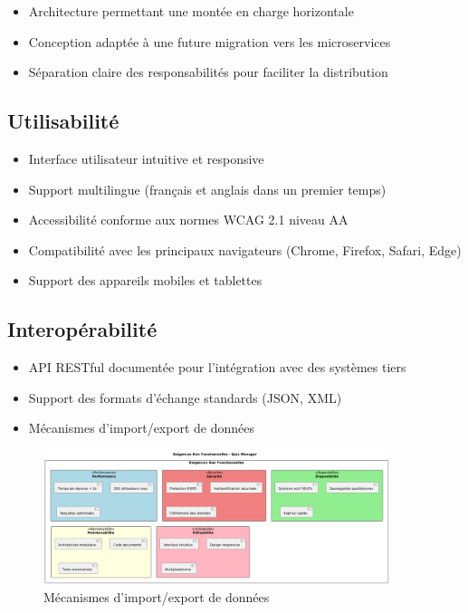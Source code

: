 \documentclass[12pt,a4paper]{report}
\begin{document}
\begin{itemize}
\item Architecture permettant une montée en charge horizontale
\item Conception adaptée à une future migration vers les microservices
\item Séparation claire des responsabilités pour faciliter la distribution
\end{itemize}

\subsection{Utilisabilité}

\begin{itemize}
\item Interface utilisateur intuitive et responsive
\item Support multilingue (français et anglais dans un premier temps)
\item Accessibilité conforme aux normes WCAG 2.1 niveau AA
\item Compatibilité avec les principaux navigateurs (Chrome, Firefox, Safari, Edge)
\item Support des appareils mobiles et tablettes
\end{itemize}

\subsection{Interopérabilité}

\begin{itemize}
\item API RESTful documentée pour l'intégration avec des systèmes tiers
\item Support des formats d'échange standards (JSON, XML)
\item Mécanismes d'import/export de données
\end{itemize}

\begin{figure}[H]
\centering
\includegraphics[width=0.9\textwidth]{latex_media/media/image12.png}
\caption{Mécanismes d'import/export de données}
\label{fig:import-export-donnees}
\end{figure}
\end{document}

